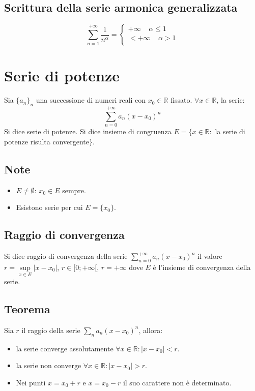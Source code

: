 \subsection{Scrittura della serie armonica generalizzata}
\begin{equation}
\sum\limits_{n=1}^{+\infty}\frac{1}{n^\alpha}=
\begin{cases}
+\infty\;\;\;\;\alpha\le 1\\
<+\infty\;\;\;\;\alpha> 1\\
\end{cases}
\end{equation}
\section{Serie di potenze}
Sia $\{a_n\}_n$ una successione di numeri reali con $x_0\in\mathbb{R}$ fissato. $\forall x\in\mathbb{R}$, la serie:
\begin{equation}
\sum\limits_{n=0}^{+\infty}a_n(x-x_0)^n
\end{equation}
Si dice serie di potenze. Si dice insieme di congruenza $E=\{x\in\mathbb{R}:$ la serie di potenze risulta convergente$\}$.
\subsection{Note}
\begin{itemize}
\item $E\neq\emptyset$: $x_0\in E$ sempre.
\item Esistono serie per cui $E=\{x_0\}$.
\end{itemize}
\subsection{Raggio di convergenza}
Si dice raggio di convergenza della serie $\sum\limits_{n=0}^{+\infty}a_n(x-x_0)^n$ il valore $r=\sup\limits_{x\in E}|x-x_0|$, $r\in[0;+\infty[$, $r=+\infty$ dove $E$ \`e 
l'insieme di convergenza della serie.
\subsection{Teorema}
Sia $r$ il raggio della serie $\sum\limits_n a_n(x-x_0)^n$, allora:
\begin{itemize}
\item la serie converge assolutamente $\forall x\in\mathbb{R}:|x-x_0|<r$.
\item la serie non converge $\forall x\in\mathbb{R}:|x-x_0|>r$.
\item Nei punti $x=x_0+r$ e $x=x_0-r$ il suo carattere non \`e determinato.
\end{itemize}

